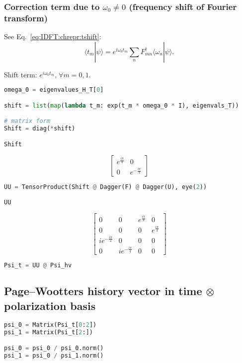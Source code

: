 \subsubsection*{Correction term due to $\omega_0 \neq 0$ (frequency shift of Fourier transform)}

See Eq.~\eqref{eq:IDFT:chrepr:tshift}:
\begin{equation}
  \langle{t_{m}}|{\psi}\rangle = e^{i\omega_{0}t_m} \sum_n F^{\dagger}_{mn} \langle{\omega_n}|{\psi}\rangle \text{.}
\end{equation}

Shift term: $e^{i\omega_{0}t_m} \text{,} \; \forall m = 0, 1$.

\begin{lstlisting}[language=Python]
omega_0 = eigenvalues_H_T[0]

shift = list(map(lambda t_m: exp(t_m * omega_0 * I), eigenvals_T))

# matrix form
Shift = diag(*shift)

Shift
\end{lstlisting}
$$
  \left[\begin{matrix}e^{\frac{i \pi}{4}} & 0\\0 & e^{- \frac{i \pi}{4}}\end{matrix}\right]
$$

\begin{lstlisting}[language=Python]
UU = TensorProduct(Shift @ Dagger(F) @ Dagger(U), eye(2))

UU
\end{lstlisting}
$$
  \left[\begin{matrix}0 & 0 & e^{\frac{i \pi}{4}} & 0\\0 & 0 & 0 & e^{\frac{i \pi}{4}}\\i e^{- \frac{i \pi}{4}} & 0 & 0 & 0\\0 & i e^{- \frac{i \pi}{4}} & 0 & 0\end{matrix}\right]
$$

\begin{lstlisting}[language=Python]
Psi_t = UU @ Psi_hv
\end{lstlisting}

\subsection*{Page--Wootters history vector in time $\otimes$ polarization basis}

\begin{lstlisting}[language=Python]
psi_0 = Matrix(Psi_t[0:2])
psi_1 = Matrix(Psi_t[2:])

psi_0 = psi_0 / psi_0.norm()
psi_1 = psi_0 / psi_1.norm()
\end{lstlisting}

